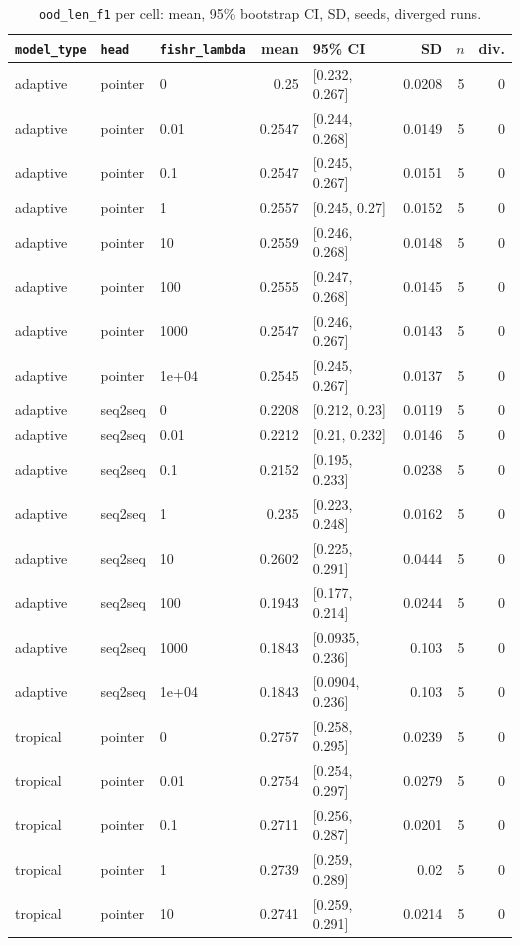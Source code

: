 \documentclass[10pt]{article}
\begin{document}
{\small
\begin{longtable}{lllrlrrr}
\caption{\texttt{ood\_len\_f1} per cell: mean, 95\% bootstrap CI, SD, seeds, diverged runs.}\label{tab:summary-ood_len_f1}\\
\toprule
\texttt{model\_type} & \texttt{head} & \texttt{fishr\_lambda} & mean & 95\% CI & SD & $n$ & div.\\
\midrule
\endhead
adaptive & pointer & 0 & 0.25 & [0.232, 0.267] & 0.0208 & 5 & 0\\
adaptive & pointer & 0.01 & 0.2547 & [0.244, 0.268] & 0.0149 & 5 & 0\\
adaptive & pointer & 0.1 & 0.2547 & [0.245, 0.267] & 0.0151 & 5 & 0\\
adaptive & pointer & 1 & 0.2557 & [0.245, 0.27] & 0.0152 & 5 & 0\\
adaptive & pointer & 10 & 0.2559 & [0.246, 0.268] & 0.0148 & 5 & 0\\
adaptive & pointer & 100 & 0.2555 & [0.247, 0.268] & 0.0145 & 5 & 0\\
adaptive & pointer & 1000 & 0.2547 & [0.246, 0.267] & 0.0143 & 5 & 0\\
adaptive & pointer & 1e+04 & 0.2545 & [0.245, 0.267] & 0.0137 & 5 & 0\\
adaptive & seq2seq & 0 & 0.2208 & [0.212, 0.23] & 0.0119 & 5 & 0\\
adaptive & seq2seq & 0.01 & 0.2212 & [0.21, 0.232] & 0.0146 & 5 & 0\\
adaptive & seq2seq & 0.1 & 0.2152 & [0.195, 0.233] & 0.0238 & 5 & 0\\
adaptive & seq2seq & 1 & 0.235 & [0.223, 0.248] & 0.0162 & 5 & 0\\
adaptive & seq2seq & 10 & 0.2602 & [0.225, 0.291] & 0.0444 & 5 & 0\\
adaptive & seq2seq & 100 & 0.1943 & [0.177, 0.214] & 0.0244 & 5 & 0\\
adaptive & seq2seq & 1000 & 0.1843 & [0.0935, 0.236] & 0.103 & 5 & 0\\
adaptive & seq2seq & 1e+04 & 0.1843 & [0.0904, 0.236] & 0.103 & 5 & 0\\
tropical & pointer & 0 & 0.2757 & [0.258, 0.295] & 0.0239 & 5 & 0\\
tropical & pointer & 0.01 & 0.2754 & [0.254, 0.297] & 0.0279 & 5 & 0\\
tropical & pointer & 0.1 & 0.2711 & [0.256, 0.287] & 0.0201 & 5 & 0\\
tropical & pointer & 1 & 0.2739 & [0.259, 0.289] & 0.02 & 5 & 0\\
tropical & pointer & 10 & 0.2741 & [0.259, 0.291] & 0.0214 & 5 & 0\\

\end{longtable}}
\end{document}
